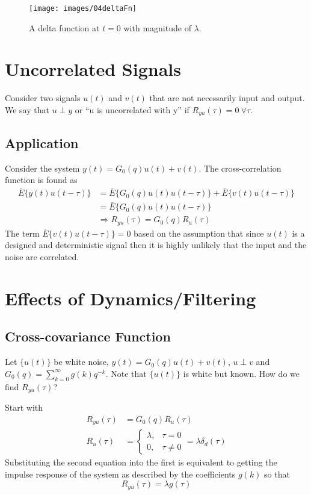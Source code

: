 \begin{figure}[ht!]
\centering
\texttt{[image: images/04deltaFn]}
\caption{A delta function at $t=0$ with magnitude of $\lambda$.}
\label{fig:04deltaFn}
\end{figure}

\section{Uncorrelated Signals}
Consider two signals $u(t)$ and $v(t)$ that are not necessarily input and output.
We say that $u\perp y$ or ``u is uncorrelated with y'' if $R_{yu}(\tau)=0~\forall \tau$.

\subsection{Application}
Consider the system $y(t)=G_0(q)u(t)+v(t)$.
The cross-correlation function is found as
\begin{align*}
\bar{E}\{y(t)u(t-\tau)\} &= \bar{E}\{G_0(q)u(t)u(t-\tau)\} + \bar{E}\{v(t)u(t-\tau)\} \\
&= \bar{E}\{G_0(q)u(t)u(t-\tau)\} \\
&\Rightarrow R_{yu}(\tau) = G_0(q)R_u(\tau)
\end{align*}
The term $\bar{E}\{v(t)u(t-\tau)\} = 0$ based on the assumption that since $u(t)$ is a designed and deterministic signal then it is highly unlikely that the input and the noise are correlated.

\section{Effects of Dynamics/Filtering}
\subsection{Cross-covariance Function}
Let $\{u(t)\}$ be white noise, $y(t)=G_0(q)u(t)+v(t)$, $u\perp v$ and $G_0(q)=\sum_{k=0}^\infty g(k)q^{-k}$.
Note that $\{u(t)\}$ is white but known.
How do we find $R_{yu}(\tau)$?

Start with
\begin{align*}
R_{yu}(\tau) &= G_0(q)R_u(\tau) \\
R_u(\tau) &= \begin{cases} \lambda, & \tau=0 \\ 0, & \tau\neq 0 \end{cases} = \lambda\delta_d(\tau)
\end{align*}
Substituting the second equation into the first is equivalent to getting the impulse response of the system as described by the coefficients $g(k)$ so that
$$R_{yu}(\tau) = \lambda g(\tau)$$

